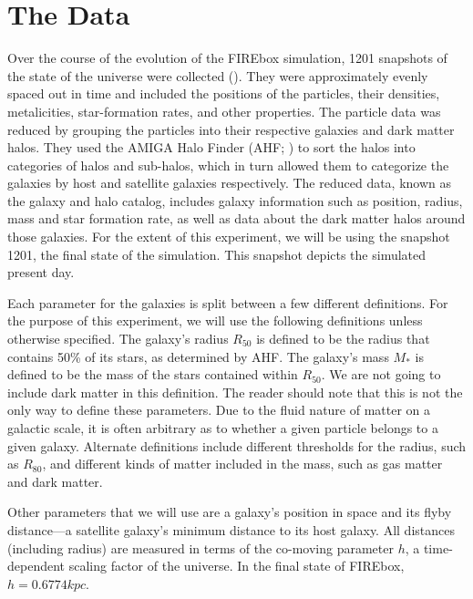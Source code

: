 
\section{The Data}
Over the course of the evolution of the FIREbox simulation, 1201 snapshots of the state of the universe were collected (\cite{feldmannFIREboxSimulatingGalaxies2022}). They were approximately evenly spaced out in time and included the positions of the particles, their densities, metalicities, star-formation rates, and other properties. The particle data was reduced by grouping the particles into their respective galaxies and dark matter halos. They used the AMIGA Halo Finder (AHF; \cite{knollmannAhfAMIGAHALO2009}) to sort the halos into categories of halos and sub-halos, which in turn allowed them to categorize the galaxies by host and satellite galaxies respectively. The reduced data, known as the galaxy and halo catalog, includes galaxy information such as position, radius, mass and star formation rate, as well as data about the dark matter halos around those galaxies. For the extent of this experiment, we will be using the snapshot 1201, the final state of the simulation. This snapshot depicts the simulated present day.

Each parameter for the galaxies is split between a few different definitions. For the purpose of this experiment, we will use the following definitions unless otherwise specified. The galaxy's radius $R_{50}$ is defined to be the radius that contains 50\% of its stars, as determined by AHF. The galaxy's mass $M_*$ is defined to be the mass of the stars contained within $R_{50}$. We are not going to include dark matter in this definition. The reader should note that this is not the only way to define these parameters. Due to the fluid nature of matter on a galactic scale, it is often arbitrary as to whether a given particle belongs to a given galaxy. Alternate definitions include different thresholds for the radius, such as $R_{80}$, and different kinds of matter included in the mass, such as gas matter and dark matter.

Other parameters that we will use are a galaxy's position in space and its flyby distance---a satellite galaxy's minimum distance to its host galaxy. All distances (including radius) are measured in terms of the co-moving parameter $h$, a time-dependent scaling factor of the universe. In the final state of FIREbox, $h = 0.6774 kpc$. 


